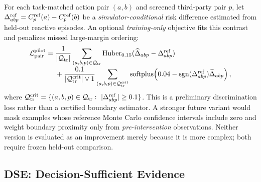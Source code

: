 \documentclass[10pt]{article}
\begin{document}
For each task-matched action pair $(a,b)$ and screened third-party pair $p$,
let $\Delta_{abp}^{\rm ref}=C_p^{\rm ref}(a)-C_p^{\rm ref}(b)$ be a
\emph{simulator-conditional} risk difference estimated from held-out
reactive episodes. An optional \emph{training-only} objective fits this
contrast and penalizes missed large-margin ordering:
\begin{align}
 \mathcal L_{\rm pair}^{\rm pilot}={}&
 \frac1{|\mathcal Q_{\rm tr}|}\sum_{(a,b,p)\in\mathcal Q_{\rm tr}}
 \operatorname{Huber}_{0.15}(\widehat\Delta_{abp}-\Delta_{abp}^{\rm ref})
 \nonumber\\[-1mm]
 &+\frac{0.1}{|\mathcal Q_{\rm tr}^{\rm crit}|\vee 1}
 \sum_{(a,b,p)\in\mathcal Q_{\rm tr}^{\rm crit}}
 \operatorname{softplus}\!\left(0.04-\operatorname{sgn}(\Delta_{abp}^{\rm ref})
 \widehat\Delta_{abp}\right),
 \label{eq:pairpilot}
\end{align}
where $\mathcal Q_{\rm tr}^{\rm crit}=\{(a,b,p)\in\mathcal Q_{\rm tr}:\
|\Delta_{abp}^{\rm ref}|\ge0.1\}$. This is a preliminary discrimination
loss rather than a certified boundary estimator. A stronger future variant
would mask examples whose reference Monte Carlo confidence intervals include
zero and weight boundary proximity only from \emph{pre-intervention}
observations. Neither version is evaluated as an improvement merely because
it is more complex; both require frozen held-out comparison.

\subsection{DSE: Decision-Sufficient Evidence}
\label{sec:dse}
\end{document}
